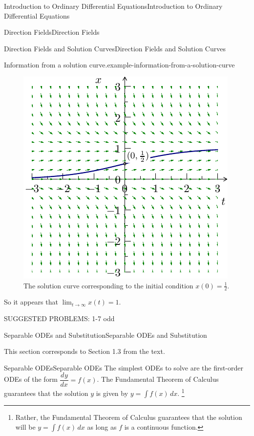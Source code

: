 \documentclass[10pt,]{book}
\numberwithin{equation}{section}
\newcommand{\dv}[3][]{\dfrac{d^{#1} #2}{d #3^{#1}}}
\begin{document}
\begin{chapterptx}{Introduction to Ordinary Differential Equations}{}{Introduction to Ordinary Differential Equations}{}{}
\begin{sectionptx}{Direction Fields}{}{Direction Fields}{}{}
\begin{subsectionptx}{Direction Fields and Solution Curves}{}{Direction Fields and Solution Curves}{}{}
\begin{example}{Information from a solution curve.}{example-information-from-a-solution-curve}
\begin{figure}
\centering
\includegraphics[width=0.5\linewidth]{images/image-5.pdf}
\caption{The solution curve corresponding to the initial condition \(x(0) = \frac{1}{2}\).\label{figure-solcurve1}}
\end{figure}
\hypertarget{p-48}{}%
So it appears that \(\lim_{t\to\infty}x(t) = 1\).%
\end{example}
\end{subsectionptx}
\begin{conclusion}{}%
\hypertarget{p-49}{}%
SUGGESTED PROBLEMS: 1-7 odd%
\end{conclusion}%
\end{sectionptx}
%
%
\typeout{************************************************}
\typeout{************************************************}
%
\begin{sectionptx}{Separable ODEs and Substitution}{}{Separable ODEs and Substitution}{}{}\label{section-separable-odes-and-substitution}
\begin{introduction}{}%
\hypertarget{p-50}{}%
This section corresponds to Section 1.3 from the text.%
\end{introduction}%
%
%
\typeout{************************************************}
\typeout{************************************************}
%
\begin{subsectionptx}{Separable ODEs}{}{Separable ODEs}{}{}\label{subsection-separable-odes}
\hypertarget{p-51}{}%
The simplest ODEs to solve are the first-order ODEs of the form \(\dv{y}{x} = f(x)\). The Fundamental Theorem of Calculus guarantees that the solution \(y\) is given by \(y = \int f(x)\,dx\).%
\footnote{Rather, the Fundamental Theorem of Calculus guarantees that the solution will be \(y=\int f(x)\,dx\) as long as \(f\) is a continuous function.\label{fn-3}}\hypertarget{p-52}{}%

\end{subsectionptx}
\end{sectionptx}
\end{chapterptx}
\end{document}
